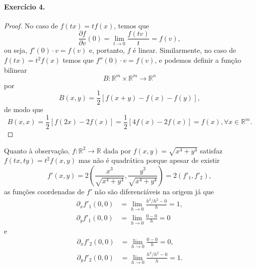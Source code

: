 \documentclass[12pt,a4paper]{article}
\newcommand{\R}{\mathbb{R}}
\begin{document}
\paragraph{Exercício 4.}
    \begin{proof}
        No caso de $f(tx) = tf(x)$, temos que
        \begin{equation*}
            \frac{\partial f}{\partial v}(0) = \lim_{t\to 0} \frac{f(tv)}{t} = f(v),
        \end{equation*}
        ou seja, $f'(0)\cdot v = f(v)$ e, portanto, $f$ é linear. Similarmente,
        no caso de $f(tx) = t^2f(x)$ temos que $f''(0)\cdot v = f(v)$, e podemos
        definir a função bilinear
        \begin{equation*}
            B:\R^m\times\R^m \to \R^n
        \end{equation*}
        por
        \begin{equation*}
            B(x,y) = \frac{1}{2}\left[ f(x+y) - f(x) - f(y) \right],
        \end{equation*}
        de modo que
        \begin{equation*}
            B(x,x) = \frac{1}{2}\left[ f(2x) - 2f(x) \right]
                   = \frac{1}{2}[ 4f(x) - 2f(x) ]
                   = f(x), \forall x\in\R^m.
        \end{equation*}
    \end{proof}
    Quanto à observação, $f:\R^2\to\R$ dada por $f(x,y) = \sqrt{x^4 + y^4}$ satisfaz
    $f(tx,ty) = t^2f(x,y)$ mas não é quadrática porque apesar de existir
    \begin{equation*}
        f'(x,y) = 2\left( \frac{x^3}{\sqrt{x^4 + y^4}}, \frac{y^3}{\sqrt{x^4 + y^4}} \right) 
                = 2(f'_1, f'_2),
    \end{equation*}
    as funções coordenadas de $f'$ não são diferenciáveis na origem já que
    \begin{align*}
        \partial_x f'_1 (0,0) &= \lim_{h\to 0} \frac{h^3/h^2 - 0}{h} = 1, \\
        \partial_y f'_1 (0,0) &= \lim_{h\to 0} \frac{0 - 0}{h} = 0
    \end{align*}
    e
    \begin{align*}
        \partial_x f'_2 (0,0) &= \lim_{h\to 0} \frac{0 - 0}{h} = 0, \\
        \partial_y f'_2 (0,0) &= \lim_{h\to 0} \frac{h^3/h^2 - 0}{h} = 1.
    \end{align*}
\end{document}
